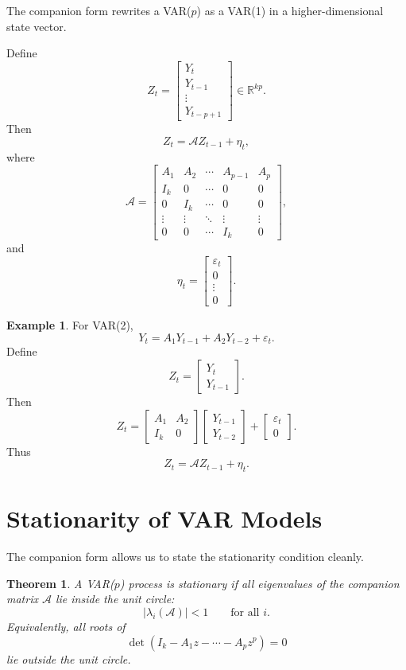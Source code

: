 \documentclass[12pt,oneside]{book}
\numberwithin{equation}{section}
\theoremstyle{definition}
\newtheorem{example}{Example}[section]
\theoremstyle{plain}
\newtheorem{theorem}{Theorem}[section]
\theoremstyle{remark}
\newcommand{\R}{\mathbb{R}}
\begin{document}
The companion form rewrites a VAR($p$) as a VAR(1) in a higher-dimensional state vector.

Define
\[
Z_t=
\begin{bmatrix}
Y_t\\
Y_{t-1}\\
\vdots\\
Y_{t-p+1}
\end{bmatrix}
\in \R^{kp}.
\]
Then
\[
Z_t
=
\mathcal{A}Z_{t-1}
+
\eta_t,
\]
where
\[
\mathcal{A}
=
\begin{bmatrix}
A_1 & A_2 & \cdots & A_{p-1} & A_p\\
I_k & 0 & \cdots & 0 & 0\\
0 & I_k & \cdots & 0 & 0\\
\vdots & \vdots & \ddots & \vdots & \vdots\\
0 & 0 & \cdots & I_k & 0
\end{bmatrix},
\]
and
\[
\eta_t=
\begin{bmatrix}
\varepsilon_t\\
0\\
\vdots\\
0
\end{bmatrix}.
\]

\begin{example}
For VAR(2),
\[
Y_t=A_1Y_{t-1}+A_2Y_{t-2}+\varepsilon_t.
\]
Define
\[
Z_t=
\begin{bmatrix}
Y_t\\
Y_{t-1}
\end{bmatrix}.
\]
Then
\[
Z_t
=
\begin{bmatrix}
A_1 & A_2\\
I_k & 0
\end{bmatrix}
\begin{bmatrix}
Y_{t-1}\\
Y_{t-2}
\end{bmatrix}
+
\begin{bmatrix}
\varepsilon_t\\
0
\end{bmatrix}.
\]
Thus
\[
Z_t=\mathcal{A}Z_{t-1}+\eta_t.
\]
\end{example}

\section{Stationarity of VAR Models}

The companion form allows us to state the stationarity condition cleanly.

\begin{theorem}
A VAR($p$) process is stationary if all eigenvalues of the companion matrix $\mathcal{A}$ lie inside the unit circle:
\[
|\lambda_i(\mathcal{A})|<1
\qquad
\text{for all } i.
\]
Equivalently, all roots of
\[
\det(I_k-A_1z-\cdots-A_pz^p)=0
\]
lie outside the unit circle.
\end{theorem}
\end{document}
